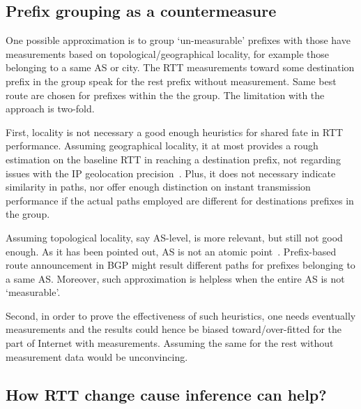 \subsection{Prefix grouping as a countermeasure}
One possible approximation is to group `un-measurable' prefixes with those have measurements based on topological/geographical locality, for example those belonging to a same AS or city. The RTT measurements toward some destination prefix in the group speak for the rest prefix without measurement. Same best route are chosen for prefixes within the the group.
The limitation with the approach is two-fold. 

First, locality is not necessary a good enough heuristics for shared fate in RTT performance. 
Assuming geographical locality, it at most provides a rough estimation on the baseline RTT in reaching a destination prefix, not regarding issues with the IP geolocation precision~\cite{Poese2011}. Plus, it does not necessary indicate similarity in paths, nor offer enough distinction on instant transmission performance if the actual paths employed are different for destinations prefixes in the group.

Assuming topological locality, say AS-level, is more relevant, but still not good enough.
As it has been pointed out, AS is not an atomic point~\cite{Muhlbauer2006}. Prefix-based route announcement in BGP might result different paths for prefixes belonging to a same AS. Moreover, such approximation is helpless when the entire AS is not `measurable'.

Second, in order to prove the effectiveness of such heuristics, one needs eventually measurements and the results could hence be biased toward/over-fitted for the part of Internet with measurements. Assuming the same for the rest without measurement data would be unconvincing.

\subsection{How RTT change cause inference can help?}

